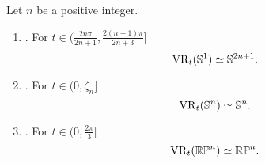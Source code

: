\medskip\proposition Let $n$ be a positive integer.
\begin{enumerate}[{\rm (a)}]
	\item\label{prop:S1}{\rm \cite[Thm.~7.4]{adamaszek2017vietoris}.}
	For $t \in (\frac{2n\pi}{2n+1}, \frac{2(n+1)\pi}{2n+3}]$
	\[
	\operatorname{VR}_t(\mathbb{S}^1) \simeq \mathbb{S}^{2n+1}.
	\]
	
	\item\label{prop:Sn}{\rm \cite[Thm.~10]{lim2020vietoris}.}
	For $t \in (0, \zeta_n]$
	\[
	\operatorname{VR}_t(\mathbb{S}^n) \simeq \mathbb{S}^n.
	\]
	
	\item\label{prop:RPn}{\rm \cite[Thm.~4.5]{adams2022metric}.}
	For $t \in (0,\frac{2\pi}{3} ]$
	\[
	\operatorname{VR}_t(\mathbb{RP}^n) \simeq \mathbb{RP}^n.
	\]
\end{enumerate}

